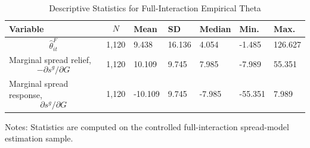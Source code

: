\begin{table}[H]\centering
\begin{threeparttable}
\caption{Descriptive Statistics for Full-Interaction Empirical Theta}
\label{tab:theta_descriptive_stats}
\scriptsize
\begin{tabularx}{\textwidth}{lYYYYYY}
\toprule
Variable & $$N$$ & Mean & SD & Median & Min. & Max. \\
\midrule
$$\widehat{\theta}^{F}_{it}$$ & 1,120 & 9.438 & 16.136 & 4.054 & -1.485 & 126.627 \\
Marginal spread relief, $$-\partial s^g/\partial G$$ & 1,120 & 10.109 & 9.745 & 7.985 & -7.989 & 55.351 \\
Marginal spread response, $$\partial s^g/\partial G$$ & 1,120 & -10.109 & 9.745 & -7.985 & -55.351 & 7.989 \\
\bottomrule
\end{tabularx}
\begin{tablenotes}[flushleft]\footnotesize
\item Notes: Statistics are computed on the controlled full-interaction spread-model estimation sample.
\end{tablenotes}
\end{threeparttable}
\end{table}
